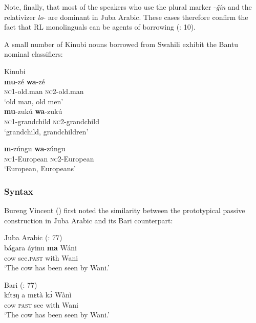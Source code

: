 \documentclass[output=paper]{langsci/langscibook}
\begin{document}
Note, finally, that most of the speakers who use the plural marker -\textit{ǧín} and the relativizer \textit{lo}{}- are dominant in Juba Arabic. These cases therefore confirm the fact that RL monolinguals can be agents of borrowing (\citealt{VanCoetsem1988}: 10).

A small number of Kinubi nouns borrowed from Swahili exhibit the Bantu nominal classifiers:

\ea\label{ex:key:}

{Kinubi \citep[57]{Wellens2003}}\\
 
\ea\textbf{mu}-zé               \textbf{wa}-zé\\
 
{\textsc{nc}1-old.man   \textsc{nc2}-old.man}\\
 {`old man, old men'}\\
 
\ex
\gll  \textbf{mu}-zukú \textbf{wa}-zukú\\
          \textsc{nc}1-grandchild   \textsc{nc}2-grandchild\\
\glt       `grandchild, grandchildren'

\ex
\gll \textbf{m}-zúngu \textbf{wa}-zúngu\\
         \textsc{nc}1-European   \textsc{nc}2-European\\
\glt       `European, Europeans'
\z
\z

 \subsubsection{Syntax}

Bureng Vincent (\citeyear[77]{BurengVincent1986}) first noted the similarity between the prototypical passive construction in Juba Arabic and its Bari counterpart:


\ea
{Juba Arabic (\citealt{BurengVincent1986}: 77)}\\
\ea\gll  bágara áyinu \textbf{ma} Wáni\\
        cow see.\textsc{past} with Wani\\
\glt      `The cow has been seen by Wani.'

\ex\label{ex:key:}
{Bari (\citealt{BurengVincent1986}: 77)}\\
\gll             kítɜŋ a mɛtà kɔ̀ Wànì\\
                 cow \textsc{past} see with Wani\\
\glt     `The cow has been seen by Wani.'
\z
\z
\end{document}
